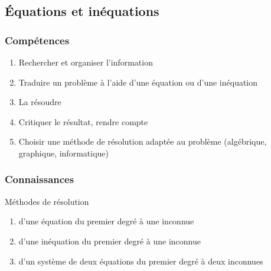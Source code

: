 \documentclass[12pt,a4paper]{article}
\begin{document}
\subsection{\'Equations et inéquations}
\begin{multicols}{2}
	\subsubsection*{Compétences}
	\begin{enumerate}
		\item Rechercher et organiser l'information
		\item Traduire un problème à l'aide d'une équation ou d'une inéquation
		\item La résoudre
		\item Critiquer le résultat, rendre compte
		\item Choisir une méthode de résolution adaptée au problème (algébrique, graphique, informatique)
	\end{enumerate}
	
	\subsubsection*{Connaissances}
	Méthodes de résolution
	\begin{enumerate}
		\item d'une équation du premier degré à une inconnue
		\item d'une inéquation du premier degré à une inconnue
		\item d'un système de deux équations du premier degré à deux inconnues
	\end{enumerate}
\end{multicols}
\end{document}
